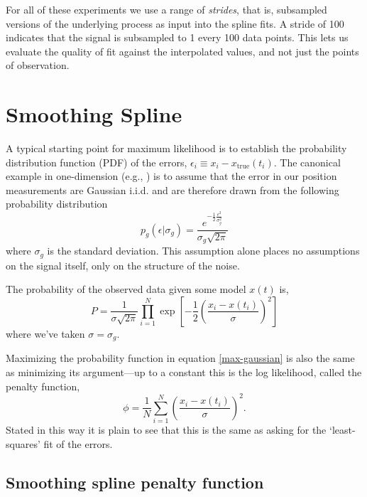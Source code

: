 \documentclass[10pt,journal]{IEEEtran}
\begin{document}
For all of these experiments we use a range of \emph{strides}, that is, subsampled versions of the underlying process as input into the spline fits. A stride of 100 indicates that the signal is subsampled to 1 every 100 data points. This lets us evaluate the quality of fit against the interpolated values, and not just the points of observation.

%
\section{Smoothing Spline}
\label{sec:smoothing_spline}
%

A typical starting point for maximum likelihood is to establish the probability distribution function (PDF) of the errors, $\epsilon_i \equiv x_i - x_{\textrm{true}}(t_i)$. The canonical example in one-dimension (e.g., \cite{press1992-book}) is to assume that the error in our position measurements are Gaussian i.i.d. and are therefore drawn from the following probability distribution
\begin{equation}
\label{gaussian_pdf}
p_g(\epsilon|\sigma_g) = \frac{e^{-\frac{1}{2}\frac{\epsilon^2}{\sigma_g^2}} }{\sigma_g \sqrt{ 2 \pi}}
\end{equation}
where $\sigma_g$ is the standard deviation. This assumption alone places no assumptions on the signal itself, only on the structure of the noise.

The probability of the observed data given some model $x(t)$ is,
\begin{equation}
\label{max-gaussian}
P = \frac{1}{\sigma \sqrt{2 \pi}} \prod_{i=1}^{N}  \exp \left[ -\frac{1}{2} \left( \frac{x_i - x(t_i)}{\sigma} \right)^2 \right]
\end{equation}
where we've taken $\sigma=\sigma_g$.

Maximizing the probability function in equation \ref{max-gaussian} is also the same as minimizing its argument---up to a constant this is the log likelihood, called the penalty function,
\begin{equation}
\label{least-squares}
\phi = \frac{1}{N}\sum_{i=1}^{N} \left( \frac{x_i - x(t_i)}{\sigma} \right)^2 .
\end{equation}
Stated in this way it is plain to see that this is the same as asking for the `least-squares' fit of the errors.


\subsection{Smoothing spline penalty function}
\end{document}
